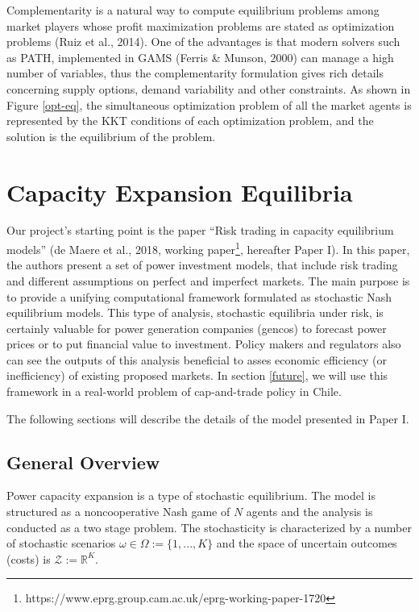 \documentclass[11pt, letterpaper]{article}
\begin{document}
Complementarity is a natural way to compute equilibrium problems among market players whose profit maximization problems are stated as optimization problems (Ruiz et al., 2014). One of the advantages is that modern solvers such as PATH, implemented in GAMS (Ferris \& Munson, 2000) can manage a high number of variables, thus the complementarity formulation gives rich details concerning supply options, demand variability and other constraints. 
As shown in Figure \ref{opt-eq}, the simultaneous optimization problem of all the market agents is represented by the KKT conditions of each optimization problem, and the solution is the equilibrium of the problem. 



\section{Capacity Expansion Equilibria}\label{paperI}
Our project's starting point is the paper ``Risk trading in capacity equilibrium models'' (de Maere et al., 2018, working paper\footnote{https://www.eprg.group.cam.ac.uk/eprg-working-paper-1720}, hereafter Paper I). In this paper, the authors present a set of power investment models, that include risk trading and different assumptions on perfect and imperfect markets. The main purpose is to provide a unifying computational framework formulated as stochastic Nash equilibrium models. This type of analysis, stochastic equilibria under risk, is certainly valuable for power generation companies (gencos) to forecast power prices or to put financial value to investment. Policy makers and regulators also can see the outputs of this analysis beneficial to asses economic efficiency (or inefficiency) of existing proposed markets. In section \ref{future}, we will use this framework in a real-world problem of cap-and-trade policy in Chile.

The following sections  will describe the details of the model presented in Paper I.

\subsection{General Overview}
Power capacity expansion is a type of stochastic equilibrium. The model is structured as a noncooperative Nash game of $N$ agents and the analysis is conducted as a two stage problem. The stochasticity is characterized by a number of stochastic scenarios $\omega \in \Omega:=\{1,...,K\}$ and the space of uncertain outcomes (costs) is $\mathcal{Z}:=\mathbb{R}^K$.
\smallskip
\end{document}
